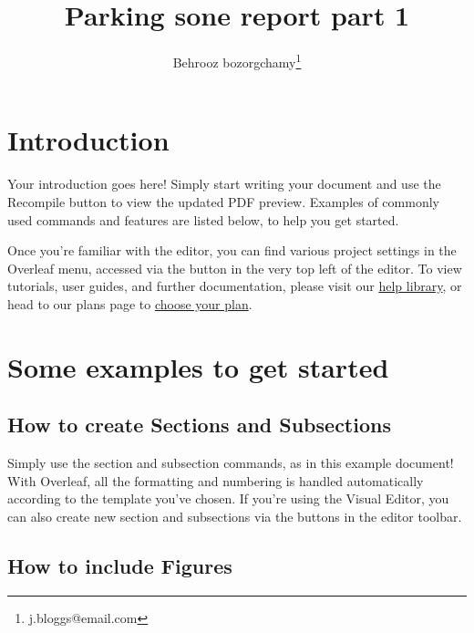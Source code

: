 \documentclass[twocolumn, 9pt]{extarticle}
\begin{document}
\title{Parking sone report part 1}

\author[1, 2]{Behrooz bozorgchamy\thanks{j.bloggs@email.com}}


\setcounter{Maxaffil}{0}
\renewcommand\Affilfont{\itshape\small}

\date{}  
\maketitle


\section{Introduction}

Your introduction goes here! Simply start writing your document and use the Recompile button to view the updated PDF preview. Examples of commonly used commands and features are listed below, to help you get started.

Once you're familiar with the editor, you can find various project settings in the Overleaf menu, accessed via the button in the very top left of the editor. To view tutorials, user guides, and further documentation, please visit our \href{https://www.overleaf.com/learn}{help library}, or head to our plans page to \href{https://www.overleaf.com/user/subscription/plans}{choose your plan}.

\section{Some examples to get started}

\subsection{How to create Sections and Subsections}

Simply use the section and subsection commands, as in this example document! With Overleaf, all the formatting and numbering is handled automatically according to the template you've chosen. If you're using the Visual Editor, you can also create new section and subsections via the buttons in the editor toolbar.

\subsection{How to include Figures}
\end{document}
